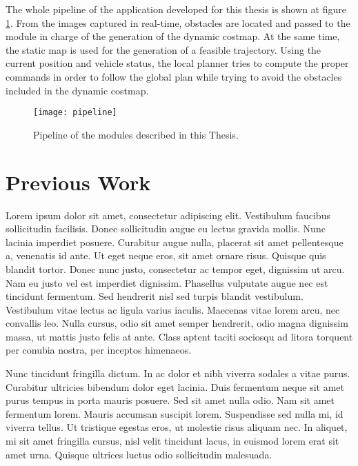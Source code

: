  The whole pipeline of the application developed for this thesis is shown at figure \ref{fig:cp01_pipeline}. From the images captured in real-time, obstacles are located and passed to the module in charge of the generation of the dynamic costmap. At the same time, the static map is used for the generation of a feasible trajectory. Using the current position and vehicle status, the local planner tries to compute the proper commands in order to follow the global plan while trying to avoid the obstacles included in the dynamic costmap.
 
 \begin{figure}[thb]\label{fig:cp01_pipeline}
      \centering
      \texttt{[image: pipeline]}
      \caption{Pipeline of the modules described in this Thesis.}
\end{figure}

 



\section{Previous Work}\label{ch:chapter01_02}
Lorem ipsum dolor sit amet, consectetur adipiscing elit. Vestibulum faucibus
sollicitudin facilisis. Donec sollicitudin augue eu lectus gravida mollis.
Nunc lacinia imperdiet posuere. Curabitur augue nulla, placerat sit amet
pellentesque a, venenatis id ante. Ut eget neque eros, sit amet ornare risus.
Quisque quis blandit tortor. Donec nunc justo, consectetur ac tempor eget,
dignissim ut arcu. Nam eu justo vel est imperdiet dignissim. Phasellus
vulputate augue nec est tincidunt fermentum. Sed hendrerit nisl sed turpis
blandit vestibulum. Vestibulum vitae lectus ac ligula varius iaculis. Maecenas
vitae lorem arcu, nec convallis leo. Nulla cursus, odio sit amet semper
hendrerit, odio magna dignissim massa, ut mattis justo felis at ante. Class
aptent taciti sociosqu ad litora torquent per conubia nostra, per inceptos
himenaeos.

Nunc tincidunt fringilla dictum. In ac dolor et nibh viverra sodales a vitae
purus. Curabitur ultricies bibendum dolor eget lacinia. Duis fermentum neque
sit amet purus tempus in porta mauris posuere. Sed sit amet nulla odio. Nam
sit amet fermentum lorem. Mauris accumsan suscipit lorem. Suspendisse sed
nulla mi, id viverra tellus. Ut tristique egestas eros, ut molestie risus
aliquam nec. In aliquet, mi sit amet fringilla cursus, nisl velit tincidunt
lacus, in euismod lorem erat sit amet urna. Quisque ultrices luctus odio
sollicitudin malesuada.

